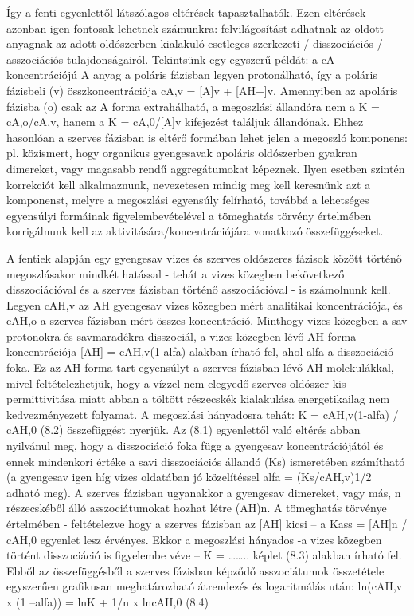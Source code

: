 Így a fenti egyenlettől látszólagos eltérések tapasztalhatók.
Ezen eltérések azonban igen fontosak lehetnek számunkra: felvilágosítást adhatnak az oldott anyagnak az adott oldószerben kialakuló esetleges szerkezeti / disszociációs / asszociációs tulajdonságairól.
Tekintsünk egy egyszerű példát: a cA koncentrációjú A anyag a poláris fázisban legyen protonálható, így a poláris fázisbeli (v) összkoncentrációja cA,v = [A]v + [AH+]v.
Amennyiben az apoláris fázisba (o) csak az A forma extrahálható, a megoszlási állandóra nem a K = cA,o/cA,v, hanem a K = cA,0/[A]v kifejezést találjuk állandónak.
Ehhez hasonlóan a szerves fázisban is eltérő formában lehet jelen a megoszló komponens: pl. közismert, hogy organikus gyengesavak apoláris oldószerben gyakran dimereket, vagy magasabb rendű aggregátumokat képeznek.
Ilyen esetben szintén korrekciót kell alkalmaznunk, nevezetesen mindig meg kell keresnünk azt a komponenst, melyre a megoszlási egyensúly felírható, továbbá a lehetséges egyensúlyi formáinak figyelembevételével a tömeghatás törvény értelmében korrigálnunk kell az aktivitására/koncentrációjára vonatkozó összefüggéseket.

A fentiek alapján egy gyengesav vizes és szerves oldószeres fázisok között történő megoszlásakor mindkét hatással - tehát a vizes közegben bekövetkező disszociációval és a szerves fázisban történő asszociációval - is számolnunk kell.
Legyen cAH,v az AH gyengesav vizes közegben mért analitikai koncentrációja, és cAH,o a szerves fázisban mért összes koncentráció.
Minthogy vizes közegben a sav protonokra és savmaradékra disszociál, a vizes közegben lévő AH forma koncentrációja [AH] = cAH,v(1-alfa) alakban írható fel, ahol alfa a disszociáció foka.
Ez az AH forma tart egyensúlyt a szerves fázisban lévő AH molekulákkal, mivel feltételezhetjük, hogy a vízzel nem elegyedő szerves oldószer kis permittivitása miatt abban a töltött részecskék kialakulása energetikailag nem kedvezményezett folyamat.
A megoszlási hányadosra tehát:
K = cAH,v(1-alfa) / cAH,0                   (8.2)
összefüggést nyerjük.
Az (8.1) egyenlettől való eltérés abban nyilvánul meg, hogy a disszociáció foka függ a gyengesav koncentrációjától és ennek mindenkori értéke a savi disszociációs állandó (Ks) ismeretében számítható (a gyengesav igen híg vizes oldatában jó közelítéssel alfa = (Ks/cAH,v)1/2 adható meg).
A szerves fázisban ugyanakkor a gyengesav dimereket, vagy más, n részecskéből álló asszociátumokat hozhat létre (AH)n.
A tömeghatás törvénye értelmében - feltételezve hogy a szerves fázisban az [AH] kicsi – a 
Kass = [AH]n / cAH,0
egyenlet lesz érvényes.
Ekkor a megoszlási hányados -a vizes közegben történt disszociáció is figyelembe véve –
K = …….. képlet                                  (8.3)
alakban írható fel.
Ebből az összefüggésből a szerves fázisban képződő asszociátumok összetétele egyszerűen grafikusan meghatározható átrendezés és logaritmálás után:
ln(cAH,v x (1 –alfa)) = lnK + 1/n x lncAH,0                                (8.4)

